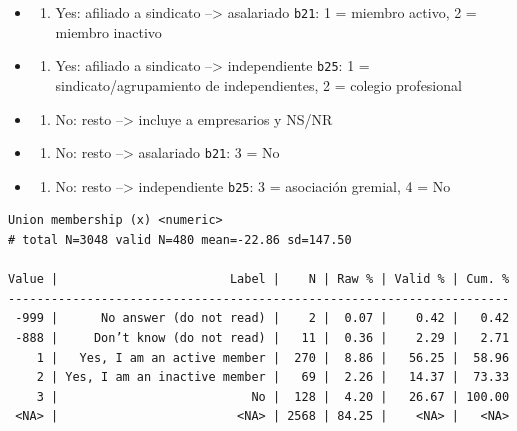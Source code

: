 \documentclass[
  letterpaper,
  DIV=11,
  numbers=noendperiod]{scrreprt}
\newenvironment{Shaded}{\begin{snugshade}}{\end{snugshade}}
\newcommand{\FunctionTok}[1]{\textcolor[rgb]{0.28,0.35,0.67}{#1}}
\newcommand{\NormalTok}[1]{\textcolor[rgb]{0.00,0.23,0.31}{#1}}
\newcommand{\SpecialCharTok}[1]{\textcolor[rgb]{0.37,0.37,0.37}{#1}}
\providecommand{\tightlist}{%
  \setlength{\itemsep}{0pt}\setlength{\parskip}{0pt}}
\begin{document}
\begin{itemize}
\tightlist
\item
  \begin{enumerate}
  \def\labelenumi{\arabic{enumi}.}
  \tightlist
  \item
    Yes: afiliado a sindicato --\textgreater{} asalariado \texttt{b21}:
    1 = miembro activo, 2 = miembro inactivo
  \end{enumerate}
\item
  \begin{enumerate}
  \def\labelenumi{\arabic{enumi}.}
  \tightlist
  \item
    Yes: afiliado a sindicato --\textgreater{} independiente
    \texttt{b25}: 1 = sindicato/agrupamiento de independientes, 2 =
    colegio profesional
  \end{enumerate}
\item
  \begin{enumerate}
  \def\labelenumi{\arabic{enumi}.}
  \setcounter{enumi}{-1}
  \tightlist
  \item
    No: resto --\textgreater{} incluye a empresarios y NS/NR
  \end{enumerate}
\item
  \begin{enumerate}
  \def\labelenumi{\arabic{enumi}.}
  \setcounter{enumi}{-1}
  \tightlist
  \item
    No: resto --\textgreater{} asalariado \texttt{b21}: 3 = No
  \end{enumerate}
\item
  \begin{enumerate}
  \def\labelenumi{\arabic{enumi}.}
  \setcounter{enumi}{-1}
  \tightlist
  \item
    No: resto --\textgreater{} independiente \texttt{b25}: 3 =
    asociación gremial, 4 = No
  \end{enumerate}
\end{itemize}

\begin{Shaded}
\end{Shaded}

\begin{verbatim}
Union membership (x) <numeric> 
# total N=3048 valid N=480 mean=-22.86 sd=147.50

Value |                        Label |    N | Raw % | Valid % | Cum. %
----------------------------------------------------------------------
 -999 |      No answer (do not read) |    2 |  0.07 |    0.42 |   0.42
 -888 |     Don’t know (do not read) |   11 |  0.36 |    2.29 |   2.71
    1 |   Yes, I am an active member |  270 |  8.86 |   56.25 |  58.96
    2 | Yes, I am an inactive member |   69 |  2.26 |   14.37 |  73.33
    3 |                           No |  128 |  4.20 |   26.67 | 100.00
 <NA> |                         <NA> | 2568 | 84.25 |    <NA> |   <NA>
\end{verbatim}
\end{document}
